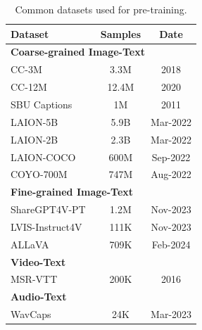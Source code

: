 \begin{table}[!t]
\centering
\caption{Common datasets used for pre-training.}
\label{tab:data-pretrain}
\begin{tabular}{lcc}
\toprule
\textbf{Dataset}               & \textbf{Samples}   & \textbf{Date}             \\
\midrule
\multicolumn{3}{l}{\textbf{Coarse-grained Image-Text}}                             \\
\midrule
CC-3M~\cite{CC}                          & 3.3M                  & 2018                      \\
CC-12M~\cite{CC-12m}                         & 12.4M                 & 2020                      \\
SBU Captions~\cite{SBU-Captions}                   & 1M                    & 2011                      \\
LAION-5B~\cite{laion-5b}                       & 5.9B                  & Mar-2022                  \\
LAION-2B~\cite{laion-5b}                       & 2.3B                  & Mar-2022                  \\
LAION-COCO~\cite{laion-coco}                     & 600M                  & Sep-2022                  \\
COYO-700M~\cite{kakaobrain2022coyo-700m}                      & 747M                  & Aug-2022                  \\
\midrule
\multicolumn{3}{l}{\textbf{Fine-grained Image-Text}}                               \\
\midrule
ShareGPT4V-PT~\cite{chen2023sharegpt4v}    & 1.2M                & Nov-2023      \\
LVIS-Instruct4V~\cite{wang2023see}                & 111K                  & Nov-2023                  \\
ALLaVA~\cite{chen2024allava}                         & 709K                  & Feb-2024                  \\
\midrule
\multicolumn{3}{l}{\textbf{Video-Text}}                                            \\
\midrule
MSR-VTT~\cite{msr-vtt}                        & 200K                  & 2016                      \\
\midrule
\multicolumn{3}{l}{\textbf{Audio-Text}}                                            \\
\midrule
WavCaps~\cite{wavcaps}                        & 24K                   & Mar-2023            \\
\bottomrule
\end{tabular}
\end{table}


